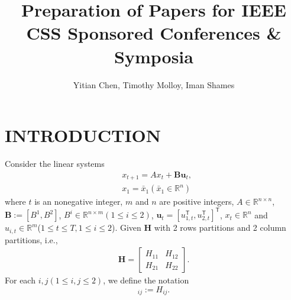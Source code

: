 \documentclass[letterpaper, 10 pt, conference]{ieeeconf}  %
\title{\LARGE \bf
Preparation of Papers for IEEE CSS Sponsored Conferences \& Symposia
}
\author{Yitian Chen, Timothy Molloy, Iman Shames%
}
\newcommand{\transpose}{\mathsf{T}}
\begin{document}
\maketitle
\thispagestyle{empty}
\pagestyle{empty}


\begin{abstract}

\end{abstract}


\section{INTRODUCTION}
Consider the linear systems
\begin{align}
    &x_{t+1} = Ax_{t} + \mathbf{B}\mathbf{u}_{t}\label{eq:linsys},\\
    &x_{1} =\bar{x}_{1}(\bar{x}_1 \in \mathbb{R}^{n})\label{eq:initialx}
\end{align}
where $t$ is an nonegative integer, $m$ and $n$ are positive integers, $A \in \mathbb{R}^{n\times n}$, $\mathbf{B} := [B^{1}, B^{2}]$, $B^{i} \in \mathbb{R}^{n\times m}(1\leq i \leq 2)$, $\mathbf{u}_{t} = [u_{1,t}^{\transpose},u_{2,t}^{\transpose}]^{\transpose}$, $x_{t}\in\mathbb{R}^n$ and $u_{i,t} \in \mathbb{R}^{m}$($1\leq t \leq T,1\leq i \leq 2$). 
Given $\mathbf{H}$ with 2 rows partitions and 2 column partitions, i.e.,
\begin{align*}
    \mathbf{H} = 
    \begin{bmatrix}
        H_{11} & H_{12}\\
        H_{21} & H_{22}
    \end{bmatrix}.
\end{align*}
For each $i,j(1\leq i,j\leq 2)$, we define the notation
\begin{equation}
    [\mathbf{H}]_{ij} := H_{ij}.
\end{equation}
\end{document}

